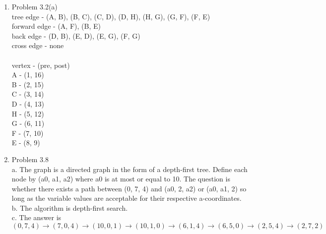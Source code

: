 \documentclass{article}
\begin{document}
\begin{enumerate}
	\item
		Problem 3.2(a)\\
		tree edge - (A, B), (B, C), (C, D), (D, H), (H, G), (G, F), (F, E)\\
		forward edge - (A, F), (B, E)\\
	        back edge - (D, B), (E, D), (E, G), (F, G)\\
	        cross edge - none\\
	         \\
		vertex - (pre, post)\\
		A - (1, 16)\\
		B - (2, 15)\\
	        C - (3, 14)\\
		D - (4, 13)\\
		H - (5, 12)\\
		G - (6, 11)\\
		F - (7, 10)\\
		E - (8, 9)
	\item
		Problem 3.8\\
		a. The graph is a directed graph in the form of a depth-first tree. Define each node by (a0, a1, a2) where a0 is at most or equal to 10. The question is whether there exists a path between (0, 7, 4) and (a0, 2, a2) or (a0, a1, 2) so long as the variable values are acceptable for their respective a-coordinates. \\
		b. The algorithm is depth-first search.\\
		c. The answer is $(0, 7, 4) \to (7, 0, 4) \to (10, 0, 1) \to (10, 1, 0) \to (6, 1, 4) \to (6, 5, 0) \to (2, 5, 4) \to (2, 7, 2)$
\end{enumerate}
\end{document}
